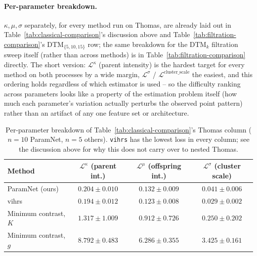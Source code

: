 \documentclass[11pt,letterpaper]{article}
\newcommand{\1}{\mathds{1}}
\theoremstyle{plain}
\theoremstyle{definitioncolon}
\begin{document}
\paragraph{Per-parameter breakdown.}
$\kappa,\mu,\sigma$ separately, for every method run on Thomas, are already
laid out in Table~\ref{tab:classical-comparison}'s discussion above and
Table~\ref{tab:filtration-comparison}'s DTM$_{\{5,10,15\}}$ row; the same
breakdown for the DTM$_k$ filtration sweep itself (rather than across
methods) is in Table~\ref{tab:filtration-comparison} directly. The
short version: $\mathcal{L}^\kappa$ (parent intensity) is the hardest target
for every method on both processes by a wide margin, $\mathcal{L}^\sigma$ /
$\mathcal{L}^{\text{cluster\_scale}}$ the easiest, and this ordering holds
regardless of which estimator is used -- so the difficulty ranking across
parameters looks like a property of the estimation problem itself (how much
each parameter's variation actually perturbs the observed point pattern)
rather than an artifact of any one feature set or architecture.

\begin{table}[tbp]
\centering
\small
\begin{tabular}{lccc}
\toprule
Method & $\mathcal{L}^\kappa$ (parent int.) & $\mathcal{L}^\mu$ (offspring int.) & $\mathcal{L}^\sigma$ (cluster scale) \\
\midrule
ParamNet (ours)        & $0.204 \pm 0.010$ & $0.132 \pm 0.009$ & $0.041 \pm 0.006$ \\
vihrs                  & $0.194 \pm 0.012$ & $0.123 \pm 0.008$ & $0.029 \pm 0.002$ \\
Minimum contrast, $K$  & $1.317 \pm 1.009$ & $0.912 \pm 0.726$ & $0.250 \pm 0.202$ \\
Minimum contrast, $g$  & $8.792 \pm 0.483$ & $6.286 \pm 0.355$ & $3.425 \pm 0.161$ \\
\bottomrule
\end{tabular}
\caption{Per-parameter breakdown of Table~\ref{tab:classical-comparison}'s
Thomas column ($n=10$ ParamNet, $n=5$ others). \texttt{vihrs} has the lowest
loss in every column; see the discussion above for why this does not carry
over to nested Thomas.}
\label{tab:classical-per-param}
\end{table}
\end{document}
